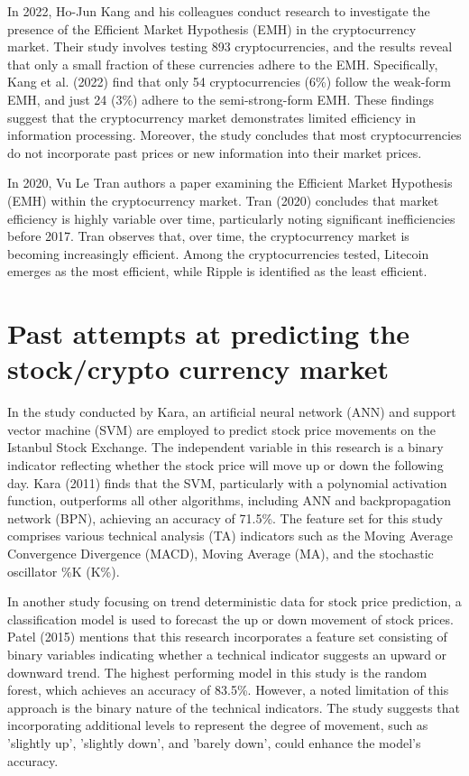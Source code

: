 In 2022, Ho-Jun Kang and his colleagues conduct research to investigate the presence of the Efficient Market Hypothesis (EMH) in the cryptocurrency market. Their study involves testing 893 cryptocurrencies, and the results reveal that only a small fraction of these currencies adhere to the EMH. Specifically, Kang et al. (2022) find that only 54 cryptocurrencies (6\%) follow the weak-form EMH, and just 24 (3\%) adhere to the semi-strong-form EMH. These findings suggest that the cryptocurrency market demonstrates limited efficiency in information processing. Moreover, the study concludes that most cryptocurrencies do not incorporate past prices or new information into their market prices.

In 2020, Vu Le Tran authors a paper examining the Efficient Market Hypothesis (EMH) within the cryptocurrency market. Tran (2020) concludes that market efficiency is highly variable over time, particularly noting significant inefficiencies before 2017. Tran observes that, over time, the cryptocurrency market is becoming increasingly efficient. Among the cryptocurrencies tested, Litecoin emerges as the most efficient, while Ripple is identified as the least efficient.

\section{Past attempts at predicting the stock/crypto currency market} 

In the study conducted by Kara, an artificial neural network (ANN) and support vector machine (SVM) are employed to predict stock price movements on the Istanbul Stock Exchange. The independent variable in this research is a binary indicator reflecting whether the stock price will move up or down the following day. Kara (2011) finds that the SVM, particularly with a polynomial activation function, outperforms all other algorithms, including ANN and backpropagation network (BPN), achieving an accuracy of 71.5\%. The feature set for this study comprises various technical analysis (TA) indicators such as the Moving Average Convergence Divergence (MACD), Moving Average (MA), and the stochastic oscillator \%K (K\%).

In another study focusing on trend deterministic data for stock price prediction, a classification model is used to forecast the up or down movement of stock prices. Patel (2015) mentions that this research incorporates a feature set consisting of binary variables indicating whether a technical indicator suggests an upward or downward trend. The highest performing model in this study is the random forest, which achieves an accuracy of 83.5\%. However, a noted limitation of this approach is the binary nature of the technical indicators. The study suggests that incorporating additional levels to represent the degree of movement, such as 'slightly up', 'slightly down', and 'barely down', could enhance the model's accuracy.

